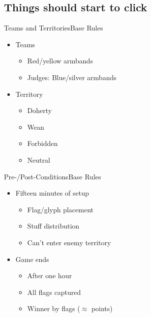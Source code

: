 \documentclass[17pt]{beamer}
\newcommand{\flavortext}[1]{}
\begin{document}
\subsection{Things should start to click}

\begin{frame}{Teams and Territories}{Base Rules}
  \begin{itemize}
  \item Teams
    \begin{itemize}
    \item Red/yellow armbands
    \item Judges: Blue/silver armbands
    \end{itemize}
  \item Territory
    \begin{itemize}
    \item Doherty
    \item Wean
    \item Forbidden
    \item Neutral
    \end{itemize}
  \end{itemize}
\end{frame}

\begin{frame}{Pre-/Post-Conditions}{Base Rules}
  \begin{itemize}
  \item Fifteen minutes of setup
    \begin{itemize}
    \item Flag/glyph placement
    \item Stuff distribution
    \item Can't enter enemy territory
    \end{itemize}
  \item Game ends
    \begin{itemize}
    \item After one hour
    \item All flags captured
    \item Winner by flags ($\approx$ points)
    \end{itemize}
  \end{itemize}
\end{frame}
\end{document}
